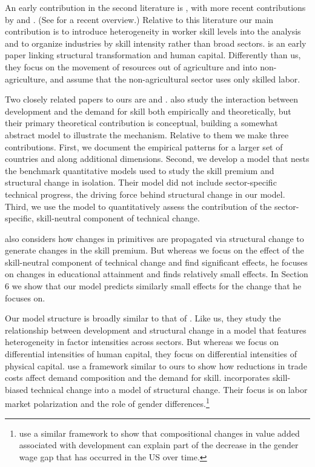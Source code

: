 \documentclass[12pt,english]{article}
\begin{document}
An early contribution in the second literature is \citet{Bau67}, with more
recent contributions by \citet{KRX01} and \citet{NgaPis07}. (See %
\citet{HRV14} for a recent overview.) Relative to this literature our main
contribution is to introduce heterogeneity in worker skill levels into the
analysis and to organize industries by skill intensity rather than broad
sectors. \citet{CasCol01} is an early paper linking structural
transformation and human capital. Differently than us, they focus on the
movement of resources out of agriculture and into non-agriculture, and
assume that the non-agricultural sector uses only skilled labor.

Two closely related papers to ours are \citet{BueKab12} and \citet{Leo15}. %
\citet{BueKab12} also study the interaction between development and the
demand for skill both empirically and theoretically, but their primary
theoretical contribution is conceptual, building a somewhat abstract model
to illustrate the mechanism. Relative to them we make three contributions.
First, we document the empirical patterns for a larger set of countries and
along additional dimensions. Second, we develop a model that nests the
benchmark quantitative models used to study the skill premium and structural
change in isolation. Their model did not include sector-specific technical
progress, the driving force behind structural change in our model. Third, we
use the model to quantitatively assess the contribution of the
sector-specific, skill-neutral component of technical change.

\citet{Leo15} also considers how changes in primitives are propagated via
structural change to generate changes in the skill premium. But whereas we
focus on the effect of the skill-neutral component of technical change and
find significant effects, he focuses on changes in educational attainment
and finds relatively small effects. In Section 6 we show that our model
predicts similarly small effects for the change that he focuses on.

Our model structure is broadly similar to that of \citet{AceGue08}. Like us,
they study the relationship between development and structural change in a
model that features heterogeneity in factor intensities across sectors. But
whereas we focus on differential intensities of human capital, they focus on
differential intensities of physical capital. \citet{CraSot19} use a
framework similar to ours to show how reductions in trade costs affect
demand composition and the demand for skill. \citet{CMR18} incorporates
skill-biased technical change into a model of structural change. Their focus
is on labor market polarization and the role of gender differences.\footnote{%
\citet{NgaPet14} use a similar framework to show that compositional changes
in value added associated with development can explain part of the decrease
in the gender wage gap that has occurred in the US over time.}
\end{document}
